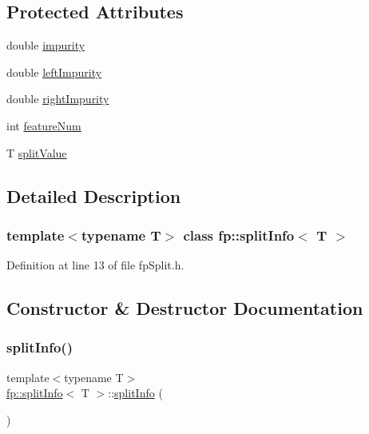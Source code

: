 \subsection*{Protected Attributes}
\begin{DoxyCompactItemize}
\item 
double \hyperlink{classfp_1_1splitInfo_aada04419633efd2c337ee25a654f3339}{impurity}
\item 
double \hyperlink{classfp_1_1splitInfo_a07ad3b8d248d48e3157aa44a2452bc8c}{left\+Impurity}
\item 
double \hyperlink{classfp_1_1splitInfo_ac70a7dadd873d5bb1535fb0e5bea45fc}{right\+Impurity}
\item 
int \hyperlink{classfp_1_1splitInfo_a77b83bf0d03ad4a6918a1250ddab65d2}{feature\+Num}
\item 
T \hyperlink{classfp_1_1splitInfo_a38374c82d5d58eafebb71b7aea024147}{split\+Value}
\end{DoxyCompactItemize}


\subsection{Detailed Description}
\subsubsection*{template$<$typename T$>$\newline
class fp\+::split\+Info$<$ T $>$}



Definition at line 13 of file fp\+Split.\+h.



\subsection{Constructor \& Destructor Documentation}
\mbox{\label{classfp_1_1splitInfo_ae6d4a528ee8ef6e3c3ab2c8d5238723f}} 
\subsubsection{\texorpdfstring{split\+Info()}{splitInfo()}}
{\footnotesize\ttfamily template$<$typename T$>$ \\
\hyperlink{classfp_1_1splitInfo}{fp\+::split\+Info}$<$ T $>$\+::\hyperlink{classfp_1_1splitInfo}{split\+Info} (\begin{DoxyParamCaption}{ }\end{DoxyParamCaption})\hspace{0.3cm}{\ttfamily [inline]}}




